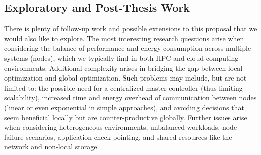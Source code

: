 \subsection{Exploratory and Post-Thesis Work}

There is plenty of follow-up work and possible extensions to this proposal that we would also like to explore.
The most interesting research questions arise when considering the balance of performance and energy consumption across multiple systems (nodes), which we typically find in both HPC and cloud computing environments.
Additional complexity arises in bridging the gap between local optimization and global optimization.
Such problems may include, but are not limited to: the possible need for a centralized master controller (thus limiting scalability), increased time and energy overhead of communication between nodes (linear or even exponential in simple approaches), and avoiding decisions that seem beneficial locally but are counter-productive globally.
Further issues arise when considering heterogeneous environments, unbalanced workloads, node failure scenarios, application check-pointing, and shared resources like the network and non-local storage.
